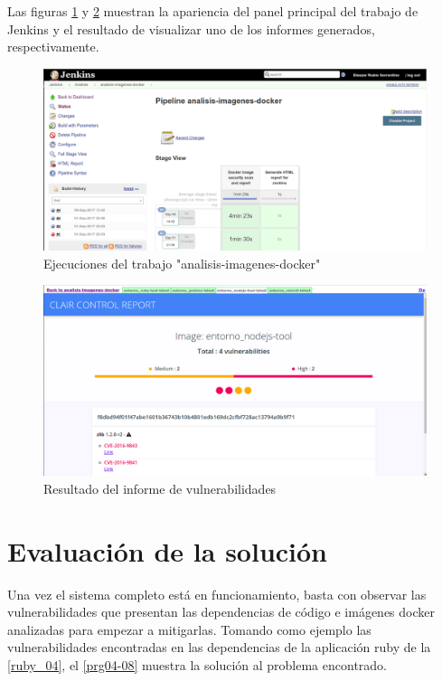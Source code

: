 Las figuras \ref{docker_02} y \ref{docker_03} muestran la apariencia del panel principal del trabajo de Jenkins y el resultado de visualizar uno de los informes generados, respectivamente.

\begin{figure}[htbp]
	\centering
	\includegraphics[width=0.90\linewidth]
	{desarrollo/figuras/docker_02.png}
	\caption{Ejecuciones del trabajo "analisis-imagenes-docker"}
	\label{docker_02}
\end{figure}

\begin{figure}[H]
	\centering
	\includegraphics[width=0.90\linewidth]
	{desarrollo/figuras/docker_03.png}
	\caption{Resultado del informe de vulnerabilidades}
	\label{docker_03}
\end{figure}

\section{Evaluación de la solución}

Una vez el sistema completo está en funcionamiento, basta con observar las vulnerabilidades que presentan las dependencias de código e imágenes docker analizadas para empezar a mitigarlas. Tomando como ejemplo las vulnerabilidades encontradas en las dependencias de la aplicación ruby de la \autoref{ruby_04}, el \autoref{prg04-08} muestra la solución al problema encontrado.

